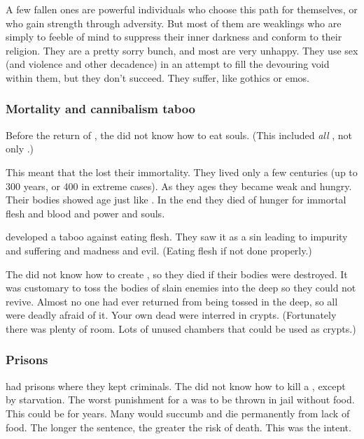 A few fallen ones are powerful individuals who choose this path for themselves, or who gain strength through adversity. 
But most of them are weaklings who are simply to feeble of mind to suppress their inner darkness and conform to their religion. They are a pretty sorry bunch, and most are very unhappy. 
They use sex (and violence and other decadence) in an attempt to fill the devouring void within them, but they don't succeed. 
They suffer, like gothics or emos. 





\subsubsection{Mortality and cannibalism taboo}
Before the return of \Semiza, the \resphain did not know how to eat \resphan souls. 
(This included \emph{all} \resphain, not only \Merkyrah.)

This meant that the \resphain lost their immortality. 
They lived only a few centuries (up to 300 years, or 400 in extreme cases). 
As they ages they became weak and hungry.
Their bodies showed age just like \humans.
In the end they died of hunger for immortal flesh and blood and power and souls.

\Merkyrah developed a taboo against eating \resphan flesh. 
They saw it as a sin leading to impurity and suffering and madness and evil. 
(Eating \resphan flesh  if not done properly.)

The \Merkyrans did not know how to create , so they died if their bodies were destroyed. 
It was customary to toss the bodies of slain enemies into the deep so they could not revive. 
Almost no one had ever returned from being tossed in the deep, so all \resphain were deadly afraid of it.
Your own dead were interred in crypts. 
(Fortunately there was plenty of room. Lots of unused chambers that could be used as crypts.)





\subsubsection{Prisons}
\Merkyrah had prisons where they kept \resphan criminals.
The \Merkyrans did not know how to kill a \resphan, except by starvation. 
The worst punishment for a \resphan was to be thrown in jail without food. 
This could be for years. 
Many would succumb and die permanently from lack of food. 
The longer the sentence, the greater the risk of death. 
This was the intent. 


